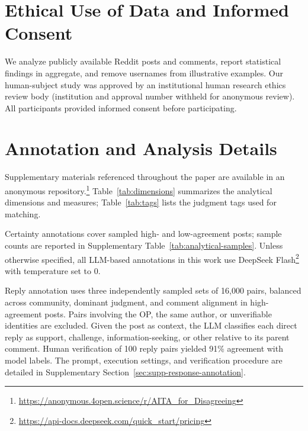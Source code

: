 \appendix

\section{Ethical Use of Data and Informed Consent}
\label{sec:ethical-use-of-data}

We analyze publicly available Reddit posts and comments, report statistical findings in aggregate, and remove usernames from illustrative examples. Our human-subject study was approved by an institutional human research ethics review body (institution and approval number withheld for anonymous review). All participants provided informed consent before participating.


\section{Annotation and Analysis Details}
\label{sec:appendix-annotation-details}
\label{sec:appendix-dimensions}

Supplementary materials referenced throughout the paper are available
in an anonymous repository.\footnote{\url{https://anonymous.4open.science/r/AITA_for_Disagreeing}}
Table~\ref{tab:dimensions} summarizes the analytical dimensions and
measures; Table~\ref{tab:tags} lists the judgment tags used for matching.



Certainty annotations cover sampled high- and low-agreement posts;
sample counts are reported in Supplementary Table~\ref{tab:analytical-samples}.
Unless otherwise specified, all LLM-based annotations in this work use DeepSeek Flash\footnote{\url{https://api-docs.deepseek.com/quick_start/pricing}} with temperature set to 0.

\label{subsec:appendix-reply-annotation}
Reply annotation uses three independently sampled sets of 16,000 pairs, balanced across community, dominant judgment, and comment
alignment in high-agreement posts.
Pairs involving the OP, the same author, or unverifiable identities are excluded.
Given the post as context, the LLM classifies each direct reply as support, challenge, information-seeking, or other relative to its parent comment.
Human verification of 100 reply pairs yielded 91\% agreement with model labels.
The prompt, execution settings, and verification procedure are detailed in Supplementary Section~\ref{sec:supp-response-annotation}.

